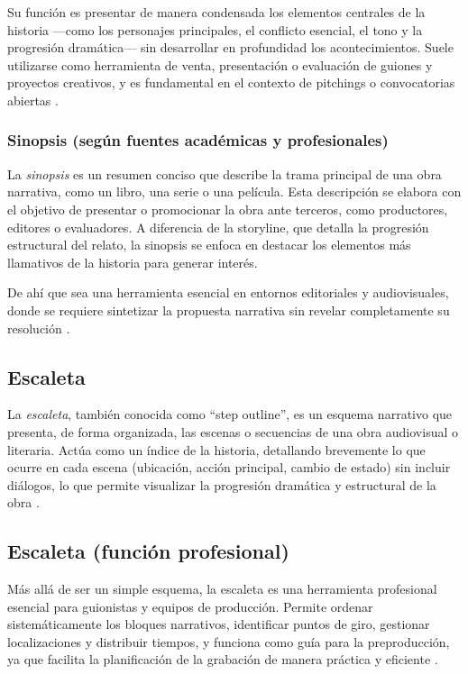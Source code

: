 \documentclass[12pt]{article}
\begin{document}
	Su función es presentar de manera condensada los elementos centrales de la historia —como los personajes principales, el conflicto esencial, el tono y la progresión dramática— sin desarrollar en profundidad los acontecimientos. Suele utilizarse como herramienta de venta, presentación o evaluación de guiones y proyectos creativos, y es fundamental en el contexto de pitchings o convocatorias abiertas \parencite{studiobinder_sinopsis}.

	\subsubsection{Sinopsis (según fuentes académicas y profesionales)}

	La \textit{sinopsis} es un resumen conciso que describe la trama principal de una obra narrativa, como un libro, una serie o una película. Esta descripción se elabora con el objetivo de presentar o promocionar la obra ante terceros, como productores, editores o evaluadores. A diferencia de la storyline, que detalla la progresión estructural del relato, la sinopsis se enfoca en destacar los elementos más llamativos de la historia para generar interés.

	De ahí que sea una herramienta esencial en entornos editoriales y audiovisuales, donde se requiere sintetizar la propuesta narrativa sin revelar completamente su resolución \parencite{studiobinder_sinopsis}.

	\subsection{Escaleta}

	La \textit{escaleta}, también conocida como “step outline”, es un esquema narrativo que presenta, de forma organizada, las escenas o secuencias de una obra audiovisual o literaria. Actúa como un índice de la historia, detallando brevemente lo que ocurre en cada escena (ubicación, acción principal, cambio de estado) sin incluir diálogos, lo que permite visualizar la progresión dramática y estructural de la obra \parencite{escaleta_wikipedia,aprendercine_escaleta}.

	\subsection{Escaleta (función profesional)}

	Más allá de ser un simple esquema, la escaleta es una herramienta profesional esencial para guionistas y equipos de producción. Permite ordenar sistemáticamente los bloques narrativos, identificar puntos de giro, gestionar localizaciones y distribuir tiempos, y funciona como guía para la preproducción, ya que facilita la planificación de la grabación de manera práctica y eficiente \parencite{treintaycinco_escaleta,escueladesarts_escaleta}.
\end{document}
